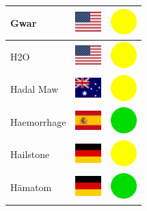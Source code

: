 \documentclass[12pt, a4paper, twoside]{report}
\begin{document}
\begin{center}
\begin{longtable}{|p{5cm}|p{2cm}|p{2cm}|}
Gwar & \includegraphics[width=1cm]{4x3/us} & \includegraphics[width=1cm]{likes/m} \\ \hline
H2O & \includegraphics[width=1cm]{4x3/us} & \includegraphics[width=1cm]{likes/m} \\ \hline
Hadal Maw & \includegraphics[width=1cm]{4x3/au} & \includegraphics[width=1cm]{likes/m} \\ \hline
Haemorrhage & \includegraphics[width=1cm]{4x3/es} & \includegraphics[width=1cm]{likes/y} \\ \hline
Hailstone & \includegraphics[width=1cm]{4x3/de} & \includegraphics[width=1cm]{likes/m} \\ \hline
Hämatom & \includegraphics[width=1cm]{4x3/de} & \includegraphics[width=1cm]{likes/y} \\ \hline

\end{longtable}
\end{center}
\end{document}
